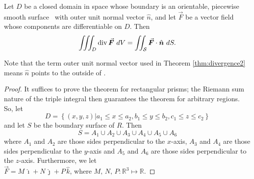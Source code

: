 \begin{theorem}
\label{thm:divergence2}
Let $D$ be a closed domain in space whose boundary is an orientable, piecewise smooth surface \surfaceS\ with outer unit normal vector $\hat n$, and let $\vec F$ be a vector field whose components are differentiable on $D$. Then
$$\iiint_D \divv \vec F\ dV=\iint_\surfaceS \vec F\cdot\hat n\ dS .$$ 
\end{theorem}

Note that the term outer unit normal vector used in Theorem \ref{thm:divergence2} means $\hat n$ points to the outside of \surfaceS.

\begin{proof}
It suffices to prove the theorem for rectangular prisms; the Riemann sum nature of the triple integral then guarantees the theorem for arbitrary regions. So, let 
$$
    D=\left\{(x,y,z)\left|a_1\leq x\leq a_2,b_1\leq y\leq b_2,c_1\leq z\leq c_2 \right.\right\}
$$
and let $S$ be the boundary surface of $R$. Then
$$
    S=A_1\cup A_2\cup A_3\cup A_4\cup A_5\cup A_6
$$
where $A_1$ and $A_2$ are those sides perpendicular to the $x$-axis, $A_3$ and $A_4$ are those sides perpendicular to the $y$-axis and $A_5$ and $A_6$ are those sides perpendicular to the $z$-axis. Furthermore, we let \\ $\vec F = M\, \hat{\imath} + N\, \hat{\jmath} + P\, \hat{k}$, where $M,\,N,\,P:\mathbb{R}^3\mapsto\mathbb{R}$. 


\end{proof}
